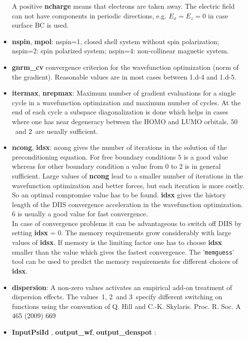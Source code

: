 \documentclass[a4paper,11pt]{report}
\begin{document}
\begin{itemize}
      A positive {\bf ncharge} means that electrons are taken away. 
      The electric field can not have components in periodic directions, e.g. $E_x=E_z=0$ in case surface BC is used.
\item {\bf nspin}, {\bf mpol}: 
      nspin=1, closed shell system without spin polarization;\hfill\\
      nspin=2: spin polarized system; 
      nspin=4: non-collinear magnetic system.
\item {\bf gnrm\_cv} convergence criterion for the wavefunction optimization (norm of the gradient).
      Reasonable values are in most cases between 1.d-4 and 1.d-5.
\item {\bf itermax}, {\bf nrepmax}: Maximum number of gradient evaluations for a single cycle in a wavefunction optimization 
      and maximum number of cycles. At the end of each cycle a subspace diagonalization is done which helps 
in cases where one has near degeneracy between the HOMO and LUMO orbitals. $50$~and $2$~are usually sufficient.
\item {\bf ncong}, {\bf idsx}: ncong gives the number of iterations in the solution of the preconditioning equation.
      For free boundary conditions $5$ is a good value whereas for other  boundary condition a value from 0 to 2 is in general sufficient. 
      Large values of {\bf ncong} lead to a smaller number of iterations in 
      the wavefunction optimization and better forces, but each iteration is more costly. 
      So an optimal compromise value has to be found.
      {\bf idsx} gives the history length of the DIIS convergence acceleration in the wavefunction optimization.
      6 is usually a good value for fast convergence.\\
      In case of convergence problems it can be advantageous 
      to switch off DIIS by setting {\bf idsx} = 0. The memory requirements grow considerably with large values of 
      {\bf idsx}. If memory is the limiting factor one has to choose {\bf idsx} smaller than the value which gives 
      the fastest convergence. The '\texttt{memguess}' tool can be used to predict the memory requirements for different choices 
      of  {\bf idsx}.
\item {\bf dispersion}:  A non-zero values activates an  empirical add-on treatment of dispersion effects.
      The values~1, 2~and 3~specify different switching on functions using the convention of 
      Q. Hill and C.-K. Skylaris.  Proc. R. Soc. A 465  (2009) 669
\item {\bf InputPsiId }, {\bf  output\_wf},  {\bf output\_denspot }: 

\end{itemize}
\end{document}

